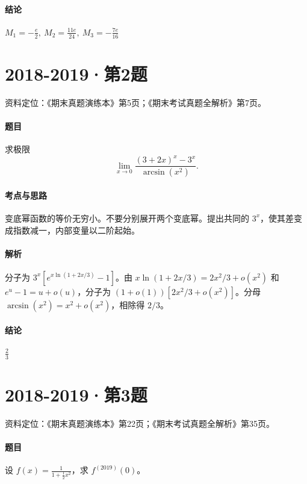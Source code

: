 \documentclass[UTF8,fontset=fandol,12pt,oneside,openany]{ctexrep}
\theoremstyle{definition}
\begin{document}
\paragraph{结论}
$M_1=-\frac e2,\ M_2=\frac{11e}{24},\ M_3=-\frac{7e}{16}$

\par\addvspace{18pt}\noindent\begin{minipage}{\linewidth}
\section{2018-2019·第2题}
\label{exam:08:q14}
资料定位：《期末真题演练本》第5页；《期末考试真题全解析》第7页。
\paragraph{题目}
求极限 \[\lim_{x\to0}\frac{(3+2x)^x-3^x}{\arcsin(x^2)}.\]
\end{minipage}\par
\paragraph{考点与思路}
变底幂函数的等价无穷小。不要分别展开两个变底幂。提出共同的 $3^x$，使其差变成指数减一，内部变量以二阶起始。
\paragraph{解析}
分子为 $3^x[e^{x\ln(1+2x/3)}-1]$。由 $x\ln(1+2x/3)=2x^2/3+o(x^2)$ 和 $e^u-1=u+o(u)$，分子为 $(1+o(1))[2x^2/3+o(x^2)]$。分母 $\arcsin(x^2)=x^2+o(x^2)$，相除得 $2/3$。
\paragraph{结论}
$\frac23$

\par\addvspace{18pt}\noindent\begin{minipage}{\linewidth}
\section{2018-2019·第3题}
\label{exam:08:q15}
资料定位：《期末真题演练本》第22页；《期末考试真题全解析》第35页。
\paragraph{题目}
设 $f(x)=\frac1{1+\frac12x^2}$，求 $f^{(2019)}(0)$。
\end{minipage}\par
\end{document}
